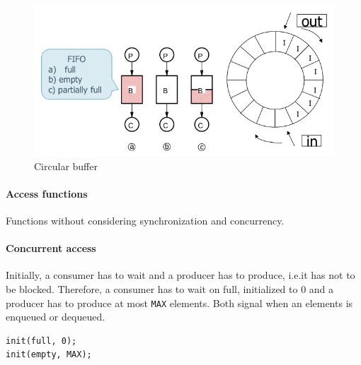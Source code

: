 \begin{figure}[hbtp]
\centering
\includegraphics[scale=0.4]{images/synchronization/producer_consumer_buffer.png}
\caption{Circular buffer}
\end{figure}

\paragraph{Access functions}
Functions without considering synchronization and concurrency.

\begin{Parallel}{}{}
\end{Parallel}

\paragraph{Concurrent access}
Initially, a consumer has to wait and a producer has to produce, i.e.\@ it has not to be blocked. Therefore, a consumer has to wait on full, initialized to 0 and a producer has to produce at most \texttt{MAX} elements. Both signal when an elements is enqueued or dequeued.
\begin{verbatim}
init(full, 0);
init(empty, MAX);
\end{verbatim}

\begin{Parallel}{}{}
\end{Parallel}

